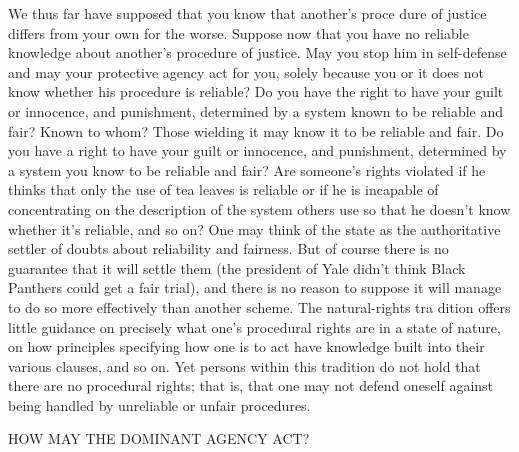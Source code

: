 \documentclass[11pt,openany]{book}
\begin{document}
We thus far have supposed that you know that another's proce dure of justice differs from your own for the worse. Suppose now that you have no reliable knowledge about another's procedure of justice. May you stop him in self-defense and may your protective agency act for you, solely because you or it does not know whether his procedure is reliable? Do you have the right to have your guilt or innocence, and punishment, determined by a system known to be reliable and fair? Known to whom? Those wielding it may know it to be reliable and fair. Do you have a right to have your guilt or innocence, and punishment, determined by a system you know to be reliable and fair? Are someone's rights violated if he thinks that only the use of tea leaves is reliable or if he is incapable of concentrating on the description of the system others use so that he doesn't know whether it's reliable, and so on? One may think of the state as the authoritative settler of doubts about reliability and fairness. But of course there is no guarantee that it will settle them (the president of Yale didn't think Black Panthers could get a fair trial), and there is no reason to suppose it will manage to do so more effectively than another scheme. The natural-rights tra dition offers little guidance on precisely what one's procedural rights are in a state of nature, on how principles specifying how one is to act have knowledge built into their various clauses, and so on. Yet persons within this tradition do not hold that there are no procedural rights; that is, that one may not defend oneself against being handled by unreliable or unfair procedures. 

HOW MAY THE DOMINANT AGENCY ACT? 
\end{document}
